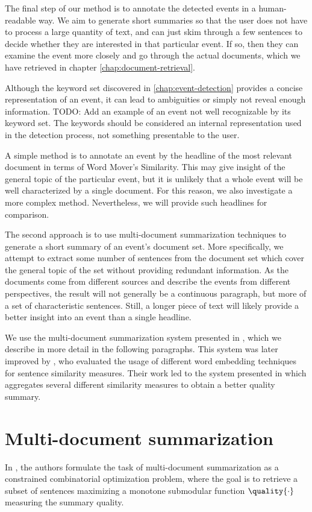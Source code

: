 The final step of our method is to annotate the detected events in a human-readable way. We aim to generate short summaries so that the user does not have to process a large quantity of text, and can just skim through a few sentences to decide whether they are interested in that particular event. If so, then they can examine the event more closely and go through the actual documents, which we have retrieved in chapter \autoref{chap:document-retrieval}.

Although the keyword set discovered in \autoref{chap:event-detection} provides a concise representation of an event, it can lead to ambiguities or simply not reveal enough information. {\color{red} TODO: Add an example of an event not well recognizable by its keyword set.} The keywords should be considered an internal representation used in the detection process, not something presentable to the user.

A simple method is to annotate an event by the headline of the most relevant document in terms of Word Mover's Similarity. This may give insight of the general topic of the particular event, but it is unlikely that a whole event will be well characterized by a single document. For this reason, we also investigate a more complex method. Nevertheless, we will provide such headlines for comparison.

The second approach is to use multi-document summarization techniques to generate a short summary of an event's document set. More specifically, we attempt to extract some number of sentences from the document set which cover the general topic of the set without providing redundant information. As the documents come from different sources and describe the events from different perspectives, the result will not generally be a continuous paragraph, but more of a set of characteristic sentences. Still, a longer piece of text will likely provide a better insight into an event than a single headline.

We use the multi-document summarization system presented in \cite{multi-summarization-1, multi-summarization-2}, which we describe in more detail in the following paragraphs. This system was later improved by \cite{mogren-1}, who evaluated the usage of different word embedding techniques for sentence similarity measures. Their work led to the system presented in \cite{mogren-2} which aggregates several different similarity measures to obtain a better quality summary.


\section{Multi-document summarization}
In \cite{multi-summarization-1}, the authors formulate the task of multi-document summarization as a constrained combinatorial optimization problem, where the goal is to retrieve a subset of sentences maximizing a monotone submodular function $\quality{\cdot}$ measuring the summary quality.

